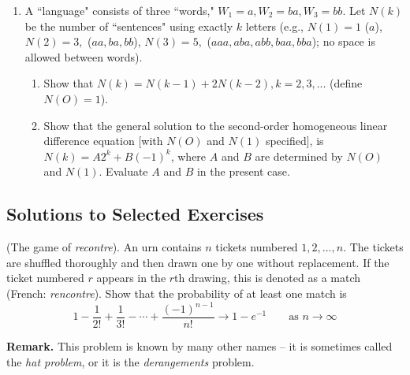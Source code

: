 \documentclass[../main.tex]{subfiles}
\begin{document}
{\begin{enumerate}
	\item  A ``language" consists of three ``words," 
	$W_1 =a, W_2 = ba, W_3 = bb$. Let
	$N(k)$ be the number of ``sentences" using exactly $k$ letters (e.g., $N(1) = 1$ ($a$), $N(2) = 3,$ ($aa, ba, bb$), $N(3) =5,$ ($aaa, aba, abb, baa, bba$); no space is
	allowed between words).
	\begin{enumerate}
	\item Show that $N(k) = N(k - 1) + 2N(k - 2), k =2,3,...$ (define $N(O) =1$).
	\item Show that the general solution to the second-order homogeneous linear
	difference equation 
	[with $N(O)$ and $N(1)$ specified], is $N(k) = A2^k +
	B(-1)^k$, where $A$ and $B$ are determined by $N(O)$ and $N(1)$. Evaluate $A$
	and $B$ in the present case.
	\end{enumerate}	
\end{enumerate}
}

\subsection{Solutions to Selected Exercises} 
\begin{solution}[Solution to 1.3.6, Ex. 9]
(The game of \textit{recontre}). An urn contains $n$ tickets numbered $1,2,...,n$.
	The tickets are shuffled thoroughly and then drawn one by one without replacement.
	If the ticket numbered $r$ appears in the $r$th drawing, this is denoted
	as a match (French: \textit{rencontre}). Show that the probability of at least one match
	is
	$$ 1 - \frac{1}{2!} + \frac{1}{3!} - \cdots + \frac{(-1)^{n-1}}{n!}
	\rightarrow 1 - e^{-1} \qquad \mbox{as } n \rightarrow \infty$$
	
\end{solution}

\textbf{Remark.} This problem is known by many other names -- it is sometimes called the \textit{hat problem}, or it is the \textit{derangements} problem. 
\end{document}
